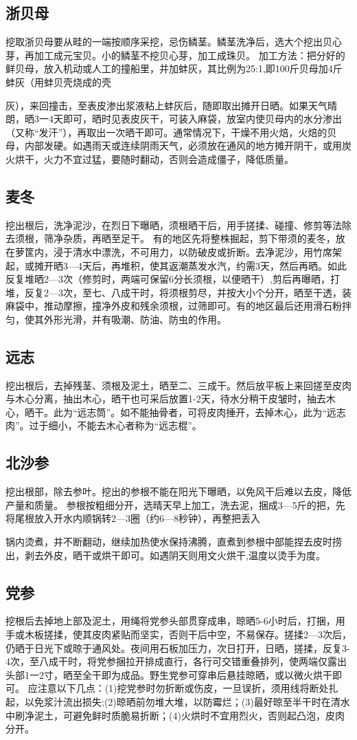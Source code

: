\documentclass{ctexbook}
\begin{document}
\subsection{浙贝母}
挖取浙贝母要从畦的一端按顺序采挖，忌伤鳞茎。鳞茎洗净后，选大个挖出贝心芽，再加工成元宝贝。小的鳞茎不挖贝心芽，加工成珠贝。
加工方法：把分好的鲜贝母，放入机动或人工的撞船里，并加蚌灰，其比例为25:1,即100斤贝母加4斤蚌灰（用蚌贝壳烧成的壳

灰），来回撞击，至表皮渗出浆液粘上蚌灰后，随即取出摊开日晒。如果天气晴朗，晒3一4天即可，晒时见表皮灰干，可装入麻袋，放室内使贝母内的水分渗出（又称“发汗”），再取出一次晒干即可。通常情况下，干燥不用火焙，火焙的贝母，内部发硬。如遇雨天或连续阴雨天气，必须放在通风的地方摊开阴干，或用炭火烘干，火力不宜过猛，要随时翻动，否则会造成僵子，降低质量。
\subsection{麦冬}
挖出根后，洗净泥沙，在烈日下曝晒，须根晒干后，用手搓揉、碰撞、修剪等法除去须根，筛净杂质，再晒至足干。
有的地区先将整株掘起，剪下带须的麦冬，放在萝筐内，浸于清水中漂洗，不可用力，以防破皮或折断。去净泥沙，用竹席架起，或摊开晒3—4天后，再堆积，使其返潮蒸发水汽，约需3天，然后再晒。如此反复堆晒2—3次（修剪时，两端可保留6分长须根，以便晒干）,剪后再曝晒，打堆，反复2—3次，至七、八成干时，将须根剪尽，并按大小个分开，晒至干透，装麻袋中，推动摩擦，撞净外皮和残余须根，过筛即可。有的地区最后还用滑石粉拌匀，使其外形光滑，并有吸潮、防油、防虫的作用。
\subsection{远志}
挖出根后，去掉残茎、须根及泥土，晒至二、三成干。然后放平板上来回搓至皮肉与木心分离，抽出木心，晒干也可采后放置1-2天，待水分稍干皮皱时，抽去木心，晒干。此为“远志筒”。如不能抽骨者，可将皮肉捶开，去掉木心，此为“远志肉”。过于细小，不能去木心者称为“远志棍”。
\subsection{北沙参}
挖出根部，除去参叶。挖出的参根不能在阳光下曝晒，以免风干后难以去皮，降低产量和质量。
参根按粗细分开，选晴天早上加工，洗去泥，捆成3—5斤的把，先将尾根放入开水内顺锅转2—3圈（约6—8秒钟），再整把丢入

锅内烫煮，并不断翻动，继续加热使水保持沸腾，直煮到参根中部能捏去皮时捞出，剥去外皮，晒干或烘干即可。如遇阴天则用文火烘干,温度以烫手为度。
\subsection{党参}
挖根后去掉地上部及泥土，用绳将党参头部贯穿成串，晾晒5-6小时后，打捆，用手或木板搓揉，使其皮肉紧贴而坚实，否则干后中空，不易保存。搓揉2—3次后，仍晒于日光下或晾于通风处。夜间用石板加压力，次日打开，日晒，搓揉，反复3-4次，至八成干时，将党参捆拉开排成直行，各行可交错重叠排列，使两端仅露出头部1一2寸，晒至全干即为成品。野生党参可穿串后悬挂晾晒，或以微火烘干即可。
应注意以下几点：(1)挖党参时勿折断或伤皮，一旦误折，须用线将断处扎起，以免浆汁流出损失;(2)晾晒前勿堆大堆，以防霉烂；(3)最好晾至半干时在清水中刷净泥土，可避免鲜时质脆易折断；(4)火烘时不宜用烈火，否则起凸泡，皮肉分开。
\end{document}
